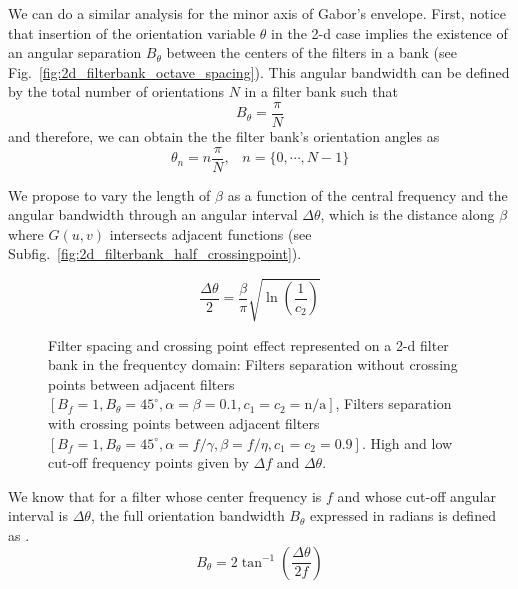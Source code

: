We can do a similar analysis for the minor axis of Gabor's envelope. First, notice that insertion of the orientation variable $\theta$ in the 2-d case implies the existence of an angular separation $B_{\theta}$ between the centers of the filters in a bank (see Fig.\ \ref{fig:2d_filterbank_octave_spacing}). This angular bandwidth can be defined by the total number of orientations $N$ in a filter bank such that
\begin{equation}\label{eq:angular_bandwidth}
    B_{\theta} = \frac{\pi}{N}
\end{equation}
and therefore, we can obtain the the filter bank's orientation angles as 
\begin{equation}\label{eq:filterbank_angles}
    \theta_n = n \frac{\pi}{N} \textrm{,} \quad n = \{0, \cdots, N-1\}
\end{equation}

We propose to vary the length of $\beta$ as a function of the central frequency and the angular bandwidth through an angular interval $\Delta \theta$, which is the distance along $\beta$ where $G(u, v)$ intersects adjacent functions (see Subfig.\ \ref{fig:2d_filterbank_half_crossingpoint}).

\begin{equation}\label{eq:orientation_interval_crossing_point}
    \frac{\Delta \theta}{2} = \frac{\beta}{\pi}\sqrt{\ln \left(\frac{1}{c_2}\right)}
\end{equation}

\begin{figure}[!ht]
\centering
\caption{Filter spacing and crossing point effect represented on a 2-d filter bank in the frequentcy domain:  Filters separation without crossing points between adjacent filters $[B_f=1, B_{\theta} = 45^{\circ}, \alpha=\beta=0.1, c_1=c_2=\text{n/a}]$,  Filters separation with crossing points between adjacent filters $[B_f=1, B_{\theta} = 45^{\circ}, \alpha=f/\gamma, \beta=f/\eta, c_1=c_2=0.9]$. High and low cut-off frequency points given by $\Delta f$ and $\Delta \theta$.}\label{fig:2d_filterbank_spacing}
\end{figure}

We know that for a filter whose center frequency is $f$ and whose cut-off angular interval is $\Delta \theta$, the full orientation bandwidth $B_\theta$ expressed in radians is defined as \citep{Daugman:JOSA:1985}.
\begin{equation}\label{eq:orientation_bandwidth_interval}
    B_{\theta} = 2 \tan^{-1} \left( \frac{\Delta \theta}{2f} \right)
\end{equation}

